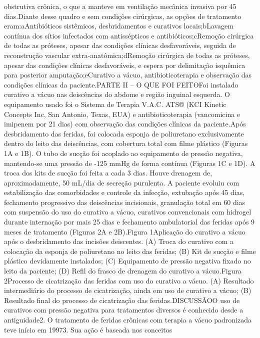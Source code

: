 \documentclass[numberinsection,times,10pt,spreadimages]{memoir}
\begin{document}
obstrutiva
crônica, o que a manteve em ventilação mecânica invasiva por 45 dias.Diante
desse quadro e sem condições cirúrgicas, as opções de tratamento
eram:aAntibióticos sistêmicos, desbridamentos e curativos locais;bLavagem
contínua dos sítios infectados com antissépticos e antibióticos;cRemoção
cirúrgica de todas as próteses, apesar das condições clínicas
desfavoráveis, seguida de reconstrução vascular extra-anatômica;dRemoção
cirúrgica de todas as próteses, apesar das condições clínicas
desfavoráveis, e espera por delimitação isquêmica para posterior
amputação;eCurativo a vácuo, antibioticoterapia e observação das condições
clínicas da
paciente.PARTE II – O QUE FOI FEITOFoi instalado curativo a vácuo nas
deiscências do abdome e região inguinal esquerda.
O equipamento usado foi o Sistema de Terapia V.A.C. ATS® (KCI Kinetic Concepts
Inc,
San Antonio, Texas, EUA) e antibioticoterapia (vancomicina e imipenem por 21
dias)
com observação das condições clínicas da paciente.Após desbridamento das
feridas, foi colocada esponja de poliuretano exclusivamente
dentro do leito das deiscências, com cobertura total com filme plástico (Figuras
1A e 1B). O tubo de sucção foi acoplado ao equipamento de pressão negativa,
mantendo-se uma pressão de -125 mmHg de forma contínua (Figuras 1C e 1D). A
troca dos kits de sucção foi feita a cada 3 dias. Houve drenagem de,
aproximadamente, 50 mL/dia de secreção purulenta. A paciente evoluiu com
estabilização das comorbidades e controle da infecção, extubação após 45 dias,
fechamento progressivo das deiscências incisionais, granulação total em 60 dias
com
suspensão do uso do curativo a vácuo, curativos convencionais com hidrogel
durante
internação por mais 25 dias e fechamento ambulatorial das feridas após 9 meses
de
tratamento (Figuras 2A e 2B).Figura 1Aplicação do curativo a vácuo após o
desbridamento das incisões
deiscentes. (A) Troca do curativo com a colocação da esponja de poliuretano
no leito das feridas; (B) Kit de sucção e filme plástico devidamente
instalados; (C) Equipamento de pressão negativa fixado no leito da paciente;
(D) Refil do frasco de drenagem do curativo a vácuo.Figura 2Processo de
cicatrização das feridas com uso do curativo a vácuo. (A)
Resultado intermediário do processo de cicatrização, ainda em uso de
curativo a vácuo; (B) Resultado final do processo de cicatrização das
feridas.DISCUSSÃOO uso de curativos com pressão negativa para tratamentos
diversos é conhecido desde a
antiguidade2. O tratamento de
feridas crônicas com terapia a vácuo padronizada teve início em 19973. Sua ação
é baseada nos conceitos
\end{document}
